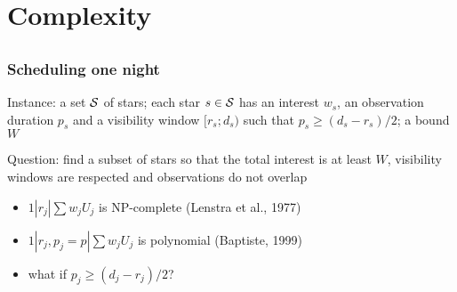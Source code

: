 \documentclass{beamer}
\begin{document}
\begin{frame}[t]
  \vfill
  \tableofcontents[sectionstyle=show,subsectionstyle=show/show/show]%
\end{frame}


\section{Complexity}
\subsection{}%

\begin{frame}
  \frametitle{Scheduling one night}
  
  Instance: a set $\cal S$ of stars; each star $s\in\cal S$ has an
  interest $w_s$, an observation duration $p_s$ and a visibility
  window $[r_s;d_s)$ \alert{such that $p_s\ge (d_s-r_s)/2$}; a bound
  $W$

  Question: find a subset of stars so that the total interest is at
  least $W$, visibility windows are respected and observations do not
  overlap

  \vfill

  \begin{itemize}
  \item<2-> $1|r_j|\sum w_jU_j$ is NP-complete (Lenstra et al., 1977)
  \item<3-> $1|r_j,p_j=p|\sum w_jU_j$ is polynomial (Baptiste, 1999)
  \item<4-> what if $p_j\ge (d_j-r_j)/2$?
  \end{itemize}

  \vfill
  

\end{frame}
\end{document}
